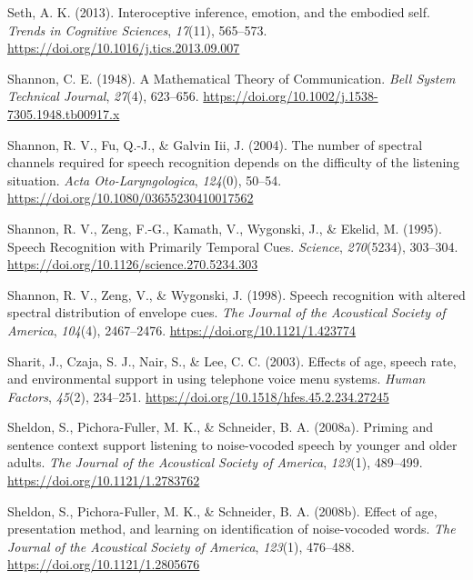 \documentclass[a4paper, nobind]{templates/ociamthesis}
\newlength{\cslhangindent}
\newenvironment{CSLReferences}[2] %
 {%
  \setlength{\parindent}{0pt}
  \ifodd #1
  \let\oldpar\par
  \def\par{\hangindent=\cslhangindent\oldpar}
  \fi
  \setlength{\parskip}{1mm}
  \setlength{\baselineskip}{6mm}
 }%
 {}
\begin{document}
\begin{CSLReferences}{1}{0}
\leavevmode{}%
Seth, A. K. (2013). Interoceptive inference, emotion, and the embodied self. \emph{Trends in Cognitive Sciences}, \emph{17}(11), 565--573. \url{https://doi.org/10.1016/j.tics.2013.09.007}

\leavevmode{}%
Shannon, C. E. (1948). A Mathematical Theory of Communication. \emph{Bell System Technical Journal}, \emph{27}(4), 623--656. \url{https://doi.org/10.1002/j.1538-7305.1948.tb00917.x}

\leavevmode{}%
Shannon, R. V., Fu, Q.-J., \& Galvin Iii, J. (2004). {The number of spectral channels required for speech recognition depends on the difficulty of the listening situation}. \emph{Acta Oto-Laryngologica}, \emph{124}(0), 50--54. \url{https://doi.org/10.1080/03655230410017562}

\leavevmode{}%
Shannon, R. V., Zeng, F.-G., Kamath, V., Wygonski, J., \& Ekelid, M. (1995). Speech Recognition with Primarily Temporal Cues. \emph{Science}, \emph{270}(5234), 303--304. \url{https://doi.org/10.1126/science.270.5234.303}

\leavevmode{}%
Shannon, R. V., Zeng, V., \& Wygonski, J. (1998). Speech recognition with altered spectral distribution of envelope cues. \emph{The Journal of the Acoustical Society of America}, \emph{104}(4), 2467--2476. \url{https://doi.org/10.1121/1.423774}

\leavevmode{}%
Sharit, J., Czaja, S. J., Nair, S., \& Lee, C. C. (2003). {Effects of age, speech rate, and environmental support in using telephone voice menu systems}. \emph{Human Factors}, \emph{45}(2), 234--251. \url{https://doi.org/10.1518/hfes.45.2.234.27245}

\leavevmode{}%
Sheldon, S., Pichora-Fuller, M. K., \& Schneider, B. A. (2008a). Priming and sentence context support listening to noise-vocoded speech by younger and older adults. \emph{The Journal of the Acoustical Society of America}, \emph{123}(1), 489--499. \url{https://doi.org/10.1121/1.2783762}

\leavevmode{}%
Sheldon, S., Pichora-Fuller, M. K., \& Schneider, B. A. (2008b). Effect of age, presentation method, and learning on identification of noise-vocoded words. \emph{The Journal of the Acoustical Society of America}, \emph{123}(1), 476--488. \url{https://doi.org/10.1121/1.2805676}


\end{CSLReferences}
\end{document}
